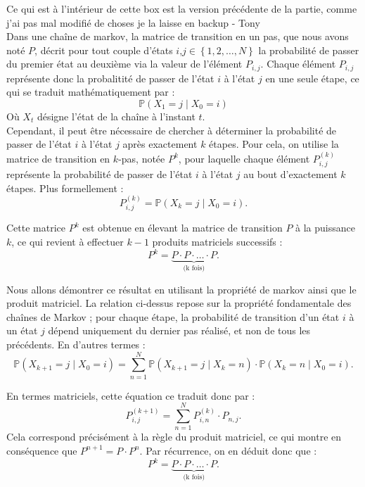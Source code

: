 \documentclass{article}
\begin{document}
\begin{tcolorbox}[colback=white,colframe=yellow!80!black,title=Box a supprimer/modifier (backup)]
Ce qui est à l'intérieur de cette box est la version précédente de la partie, comme j'ai pas mal modifié de choses je la laisse en backup - Tony \\

Dans une chaîne de markov, la matrice de transition en un pas, que nous avons noté $P$, décrit pour tout couple d'états $i$,$j \in \left\{ 1, 2 , \ldots, N \right\}$ la probabilité de passer du premier état au deuxième via la valeur de l'élément $P_{i,j}$. Chaque élément $P_{i,j}$ représente donc la probalitité de passer de l'état $i$ à l'état $j$ en une seule étape, ce qui se traduit mathématiquement par :
\[
\mathbb{P}(X_1 = j \mid X_0 = i)
\]
Où $X_t$ désigne l'état de la chaîne à l'instant $t$. \\

Cependant, il peut être nécessaire de chercher à déterminer la probabilité de passer de l'état $i$ à l'état $j$ après exactement $k$ étapes. Pour cela, on utilise la matrice de transition en $k$-pas, notée $P^k$, pour laquelle chaque élément $P_{i,j}^{(k)}$ représente la probabilité de passer de l'état $i$ à l'état $j$ au bout d'exactement $k$ étapes. Plus formellement :
\[
P_{i,j}^{(k)} = \mathbb{P}(X_k = j \mid X_0 = i).
\]

Cette matrice $P^k$ est obtenue en élevant la matrice de transition $P$ à la puissance $k$, ce qui revient à effectuer $k-1$ produits matriciels successifs :
\[
P^k = \underbrace{P \cdot P \cdot \ldots \cdot P}_\text{(k fois)}.
\]

Nous allons démontrer ce résultat en utilisant la propriété de markov ainsi que le produit matriciel.
La relation ci-dessus repose sur la propriété fondamentale des chaînes de Markov ; pour chaque étape, la probabilité de transition d'un état $i$ à un état $j$ dépend uniquement du dernier pas réalisé, et non de tous les précédents. En d'autres termes :
\[
\mathbb{P}(X_{k+1} = j \mid X_0 = i) = \sum_{n=1}^N \mathbb{P}(X_{k+1} = j \mid X_k = n) \cdot \mathbb{P}(X_k = n \mid X_0 = i).
\]

En termes matriciels, cette équation ce traduit donc par :
\[
P_{i,j}^{(k+1)} = \sum_{n=1}^N P_{i,n}^{(k)} \cdot P_{n,j}.
\]
Cela correspond précisément à la règle du produit matriciel, ce qui montre en conséquence que $P^{n+1} = P \cdot P^n$. Par récurrence, on en déduit donc que :
\[
P^k = \underbrace{P \cdot P \cdot \ldots \cdot P}_\text{(k fois)}.
\]
\end{tcolorbox}
\end{document}
